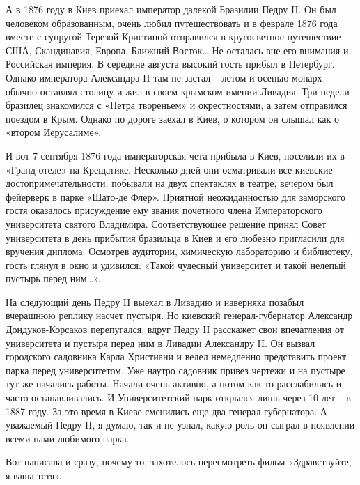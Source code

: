 А в 1876 году в Киев приехал император далекой Бразилии Педру II. Он был
человеком образованным, очень любил путешествовать и в  феврале 1876 года
вместе с супругой Терезой-Кристиной отправился в кругосветное путешествие -
США, Скандинавия, Европа, Ближний Восток… Не осталась вне его внимания и
Российская империя. В середине августа высокий гость прибыл в Петербург. Однако
императора Александра II там не застал – летом и осенью монарх обычно оставлял
столицу и жил в своем крымском имении Ливадия. Три недели бразилец знакомился с
«Петра твореньем» и окрестностями, а затем отправился поездом в Крым. Однако по
дороге заехал в Киев, о котором он слышал как о «втором Иерусалиме». 

И вот 7 сентября 1876 года императорская чета прибыла в Киев, поселили их в
«Гранд-отеле» на Крещатике. Несколько дней они осматривали все киевские
достопримечательности, побывали на двух спектаклях в театре, вечером был
фейерверк в парке «Шато-де Флер». Приятной неожиданностью для заморского гостя
оказалось присуждение ему звания почетного члена Императорского университета
святого Владимира. Соответствующее решение принял Совет университета в день
прибытия бразильца в Киев и его любезно пригласили для вручения диплома.
Осмотрев аудитории, химическую лабораторию и библиотеку, гость глянул в окно и
удивился: «Такой чудесный университет и такой нелепый пустырь перед ним…». 

На следующий день Педру II выехал в Ливадию и  наверняка позабыл вчерашнюю
реплику насчет пустыря. Но киевский генерал-губернатор Александр
Дондуков-Корсаков перепугался, вдруг Педру II расскажет свои впечатления от
университета и пустыря перед ним в Ливадии Александру II. Он вызвал городского
садовника Карла Христиани и велел немедленно представить проект парка перед
университетом. Уже наутро садовник привез чертежи и на пустыре тут же начались
работы. Начали очень активно, а потом как-то расслабились и  часто
останавливались. И Университетский парк открылся лишь через 10 лет – в 1887
году. За это время в Киеве сменились еще два генерал-губернатора. А уважаемый
Педру II, я думаю, так и не узнал, какую роль он сыграл в появлении всеми нами
любимого парка.

Вот написала и сразу, почему-то, захотелось пересмотреть фильм «Здравствуйте, я
ваша тетя».
